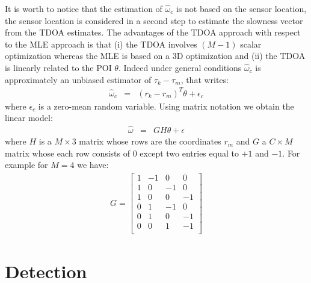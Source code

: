 \documentclass[graybox]{svmult/styles/svmult}
\def\hat{\widehat}
\begin{document}
It is worth to notice that the estimation of $\hat \omega_{c}$ is not based on the sensor location, the sensor location is considered in a second step to estimate the slowness vector from the TDOA  estimates. The  advantages of the TDOA approach with respect to the MLE approach is that (i) the TDOA involves $(M-1)$ scalar optimization whereas the MLE is based on a 3D optimization and (ii) the TDOA is  linearly related to the POI $\theta$. Indeed under general conditions $\hat \omega_{c}$ is approximately an unbiased estimator of $\tau_{k}-\tau_{m}$, that writes:
\begin{eqnarray}
 \label{eq:linearThetamodel}
  \hat\omega_{c} &=&(r_{k}-r_{m})^{T}\theta+\epsilon_{c}
 \end{eqnarray}
where $\epsilon_{c}$  is a zero-mean random variable. Using matrix notation we obtain the linear model:
\begin{eqnarray}
 \label{eq:linearThetamodel-matrixform}
\hat\omega &=& GH\theta + \epsilon
\end{eqnarray}
where $H$ is a $M\times 3$ matrix whose rows are the coordinates $r_{m}$ and  $G$ a $C\times M$ matrix whose each row consists of $0$ except two entries equal to $+1$ and $-1$. For example for $M=4$ we have:
 \begin{eqnarray}
 \label{eq:GWtau}
G=
\begin{bmatrix}
1&-1&0&0\\
1&0&-1&0\\
1&0&0&-1\\
0&1&-1&0\\
0&1&0&-1\\
0&0&1&-1\\
\end{bmatrix}
 \end{eqnarray}
 
 
 


\section{Detection}
\end{document}
